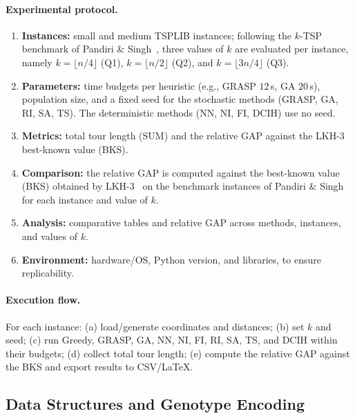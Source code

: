 \documentclass[conference]{IEEEtran}
\begin{document}
\paragraph{Experimental protocol.}
\begin{enumerate}[label=\roman*)]
  \item \textbf{Instances:} small and medium TSPLIB instances; following the $k$-TSP benchmark of Pandiri \& Singh~\cite{pandiri2020}, three values of $k$ are evaluated per instance, namely $k=\lfloor n/4\rfloor$ (Q1), $k=\lfloor n/2\rfloor$ (Q2), and $k=\lfloor 3n/4\rfloor$ (Q3).
  \item \textbf{Parameters:} time budgets per heuristic (e.g., GRASP $12$\,s, GA $20$\,s), population size, and a fixed seed for the stochastic methods (GRASP, GA, RI, SA, TS). The deterministic methods (NN, NI, FI, DCIH) use no seed.
  \item \textbf{Metrics:} total tour length (SUM) and the relative GAP against the LKH-3 best-known value (BKS).
  \item \textbf{Comparison:} the relative GAP is computed against the best-known value (BKS) obtained by LKH-3~\cite{Helsgaun} on the benchmark instances of Pandiri \& Singh~\cite{pandiri2020} for each instance and value of $k$.
  \item \textbf{Analysis:} comparative tables and relative GAP across methods, instances, and values of $k$.
  \item \textbf{Environment:} hardware/OS, Python version, and libraries, to ensure replicability.
\end{enumerate}

\paragraph{Execution flow.}
For each instance: (a) load/generate coordinates and distances; (b) set $k$ and seed;
(c) run Greedy, GRASP, GA, NN, NI, FI, RI, SA, TS, and DCIH within their budgets; (d) collect total tour length;
(e) compute the relative GAP against the BKS and export results to CSV/LaTeX.

\begingroup
{}
\setlength{\abovedisplayskip}{6pt}
\setlength{\belowdisplayskip}{6pt}

\subsection{Data Structures and Genotype Encoding}
\end{document}
